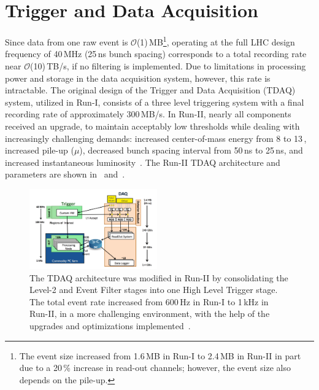 \section{Trigger and Data Acquisition}
Since data from one raw event is $\mathcal{O}$(1)\,MB\footnote{
	The event size increased from 1.6\,MB in Run-I to 2.4\,MB in Run-II in part due to a 20\,\% increase in read-out channels; however, the event size also depends on the pile-up. 
}, operating at the full LHC design frequency of 40\,MHz (25\,ns bunch spacing) corresponds to a total recording rate near $\mathcal{O}$(10)\,TB/s,
if no filtering is implemented. Due to limitations in processing power and storage in the data acquisition system, however, this rate is intractable. The original design of the Trigger and Data Acquisition (TDAQ) system, utilized in Run-I, consists of a three level triggering system with a final recording rate of approximately 300\,MB/s. In Run-II, nearly all components received an upgrade, to maintain acceptably low \pt thresholds while dealing with increasingly challenging demands: increased center-of-mass energy from 8\,\TeV\,to 13\,\TeV, increased pile-up ($\mu$), decreased bunch spacing interval from 50\,ns to 25\,ns, and increased instantaneous luminosity~\cite{trigger_2015, trigger_evo}. The Run-II TDAQ architecture and parameters are shown in~\Fig{\ref{fig:tdaq_run1_run2_v2}} and~\Tab{\ref{tab:tdaq_run1_run2}}.

\begin{figure}
\begin{center}
\includegraphics[width=0.49\textwidth]{figures/Atlas/tdaq_run2_v1}
\end{center}
\caption[Trigger and Data Acquisition architecture in Run-II]{The TDAQ architecture was modified in Run-II by consolidating the Level-2 and Event Filter stages into one High Level Trigger stage. The total event rate increased from 600\,Hz in Run-I to 1\,kHz in Run-II, in a more challenging environment, with the help of the upgrades and optimizations implemented~\cite{trigger_evo}.}
\label{fig:tdaq_run1_run2_v2}
\end{figure}

